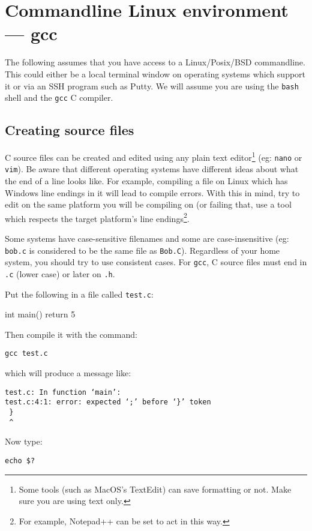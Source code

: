 
\chapter{Commandline Linux environment --- gcc}

The following assumes that you have access to a Linux/Posix/BSD commandline.
This could either be a local terminal window on operating systems which support it or via an SSH program such as Putty.
We will assume you are using the \texttt{bash} shell and the \texttt{gcc} C compiler.

\section{Creating source files}
C source files can be created and edited using any plain text editor\footnote{Some tools (such as MacOS's TextEdit) can save formatting or not. Make sure you are using text only.} (eg: \texttt{nano} or \texttt{vim}).
Be aware that different operating systems have different ideas about what the end of a line looks like.
For example, compiling a file on Linux which has Windows line endings in it will lead to compile errors.
With this in mind, try to edit on the same platform you will be compiling on (or failing that, use a tool which respects the target
platform's line endings\footnote{For example, Notepad++ can be set to act in this way.}.

Some systems have case-sensitive filenames and some are case-insensitive (eg: \texttt{bob.c} is considered to be the same file as \texttt{Bob.C}).
Regardless of your home system, you should try to use consistent cases.
For \texttt{gcc}, C source files must end in \texttt{.c} (lower case) or later on \texttt{.h}.

Put the following in a file called \texttt{test.c}:
\begin{codeblock}
int main()
{
    return 5
}
\end{codeblock}

Then compile it with the command:
\begin{verbatim}
gcc test.c 
\end{verbatim}
which will produce a message like:
\begin{verbatim}
test.c: In function ‘main’:
test.c:4:1: error: expected ‘;’ before ‘}’ token
 }
 ^
\end{verbatim}

Now type:
\begin{verbatim}
echo $? 
\end{verbatim}

